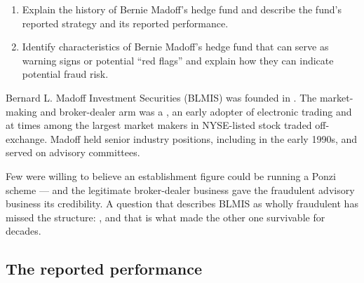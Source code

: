 

\begin{imkeybox}[title={The two objectives in this reading}]
\begin{enumerate}[label=\textbf{\alph*.}]
\item Explain the history of Bernie Madoff's hedge fund and describe the fund's reported strategy and its reported performance.
\item Identify characteristics of Bernie Madoff's hedge fund that can serve as warning signs or potential ``red flags'' and explain how they can indicate potential fraud risk.
\end{enumerate}
\end{imkeybox}


Bernard L. Madoff Investment Securities (BLMIS) was founded in . The
market-making and broker-dealer arm was a ,
an early adopter of electronic trading and at times among the largest market
makers in NYSE-listed stock traded off-exchange. Madoff held senior industry
positions, including  in the early 1990s,
and served on advisory committees.

\begin{imtrapbox}[breakable=false,title={The respectability was part of the cover}]
Few were willing to believe an establishment figure could be running a Ponzi
scheme --- and the legitimate broker-dealer business gave the fraudulent advisory
business its credibility. A question that describes BLMIS as wholly fraudulent has
missed the structure: , and that is what made the other
one survivable for decades.
\end{imtrapbox}

\subsection{The reported performance}

